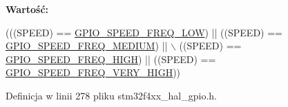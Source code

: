 {\bfseries Wartość\+:}
\begin{DoxyCode}
(((SPEED) == \hyperlink{group___g_p_i_o__speed__define_gab7916c4265bfa1b26a5205ea9c1caa4e}{GPIO\_SPEED\_FREQ\_LOW})  || ((SPEED) == 
      \hyperlink{group___g_p_i_o__speed__define_ga1724a25a9cf00ebf485daeb09cfa1e25}{GPIO\_SPEED\_FREQ\_MEDIUM}) || \(\backslash\)
                              ((SPEED) == \hyperlink{group___g_p_i_o__speed__define_gaef5898db71cdb957cd41f940b0087af8}{GPIO\_SPEED\_FREQ\_HIGH}) || ((SPEED) == 
      \hyperlink{group___g_p_i_o__speed__define_ga1944cf10e2ab172810d38b681d40b771}{GPIO\_SPEED\_FREQ\_VERY\_HIGH}))
\end{DoxyCode}


Definicja w linii 278 pliku stm32f4xx\+\_\+hal\+\_\+gpio.\+h.

